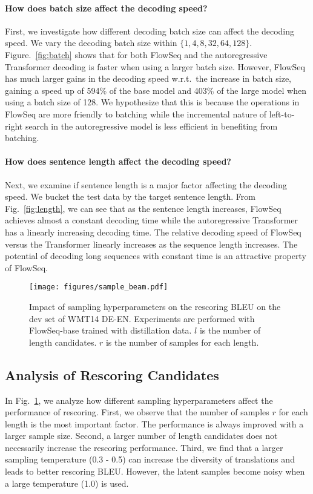 \documentclass[11pt,a4paper]{article}
\begin{document}
\paragraph{How does batch size affect the decoding speed?}
First, we investigate how different decoding batch size can affect the decoding speed. We vary the decoding batch size within $\{1, 4, 8, 32, 64, 128\}$. Figure.~\ref{fig:batch} shows that for both FlowSeq and the autoregressive Transformer decoding is faster when using a larger batch size. However, FlowSeq has much larger gains in the decoding speed w.r.t.~the increase in batch size, gaining a speed up of 594\% of the base model and 403\% of the large model when using a batch size of 128. We hypothesize that this is because the operations in FlowSeq are more friendly to batching while the incremental nature of left-to-right search in the autoregressive model is less efficient in benefiting from batching.

\paragraph{How does sentence length affect the decoding speed?}
Next, we examine if sentence length is a major factor affecting the decoding speed. We bucket the test data by the target sentence length. From Fig.~\ref{fig:length}, we can see that as the sentence length increases, FlowSeq achieves almost a constant decoding time while the autoregressive Transformer has a linearly increasing decoding time. The relative decoding speed of FlowSeq versus the Transformer linearly increases as the sequence length increases. The potential of decoding long sequences with constant time is an attractive property of FlowSeq.

\begin{figure}[tb]
  \centering
  \texttt{[image: figures/sample\_beam.pdf]}
  \caption{Impact of sampling hyperparameters on the rescoring BLEU on the dev set of WMT14 DE-EN. Experiments are performed with FlowSeq-base trained with distillation data. $l$ is the number of length candidates. $r$ is the number of samples for each length.} \label{fig:rerank}
  \vspace{-4mm}
\end{figure}
\subsection{Analysis of Rescoring Candidates}\label{subsec:rescore}
In Fig.~\ref{fig:rerank}, we analyze how different sampling hyperparameters affect the performance of rescoring. First, we observe that the number of samples $r$ for each length is the most important factor. The performance is always improved with a larger sample size. Second, a larger number of length candidates does not necessarily increase the rescoring performance. Third, we find that a larger sampling temperature (0.3 - 0.5) can increase the diversity of translations and leads to better rescoring BLEU. However, the latent samples become noisy when a large temperature (1.0) is used.
\end{document}
